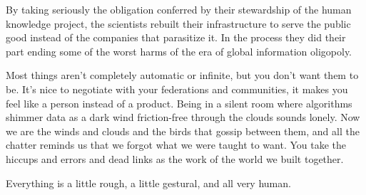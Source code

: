 By taking seriously the obligation conferred by their stewardship of the
human knowledge project, the scientists rebuilt their infrastructure to
serve the public good instead of the companies that parasitize it. In
the process they did their part ending some of the worst harms of the
era of global information oligopoly.

Most things aren't completely automatic or infinite, but you don't want
them to be. It's nice to negotiate with your federations and
communities, it makes you feel like a person instead of a product. Being
in a silent room where algorithms shimmer data as a dark wind
friction-free through the clouds sounds lonely. Now we are the winds and
clouds and the birds that gossip between them, and all the chatter
reminds us that we forgot what we were taught to want. You take the
hiccups and errors and dead links as the work of the world we built
together.

Everything is a little rough, a little gestural, and all very human.

\citep{d} 
